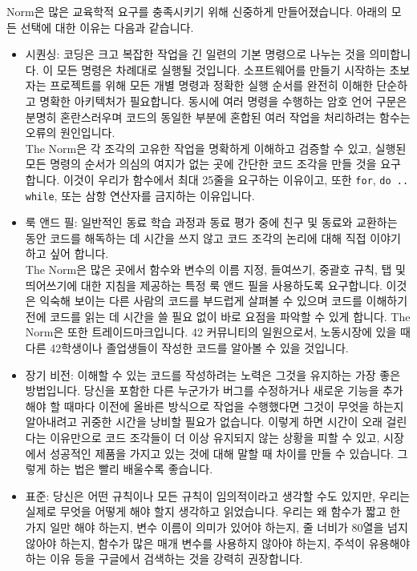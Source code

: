 \documentclass{42-ko}
\begin{document}
    Norm은 많은 교육학적 요구를 충족시키기 위해 신중하게 만들어졌습니다. 아래의
    모든 선택에 대한 이유는 다음과 같습니다.
    \begin{itemize}

    \item 시퀀싱: 코딩은 크고 복잡한 작업을 긴 일련의 기본 명령으로 나누는 것을 의미합니다.
      이 모든 명령은 차례대로 실행될 것입니다. 소프트웨어를 만들기 시작하는 초보자는 프로젝트를 위해
      모든 개별 명령과 정확한 실행 순서를 완전히 이해한 단순하고 명확한 아키텍처가 필요합니다.
      동시에 여러 명령을 수행하는 암호 언어 구문은 분명히 혼란스러우며 코드의 동일한 부분에 혼합된
      여러 작업을 처리하려는 함수는 오류의 원인입니다.\\
      The Norm은 각 조각의 고유한 작업을 명확하게 이해하고 검증할 수 있고, 실행된 모든 명령의 순서가
      의심의 여지가 없는 곳에 간단한 코드 조각을 만들 것을 요구합니다. 이것이 우리가 함수에서
      최대 25줄을 요구하는 이유이고, 또한 \texttt{for}, \texttt{do .. while}, 또는 삼항 연산자를
      금지하는 이유입니다.

    \item 룩 앤드 필: 일반적인 동료 학습 과정과 동료 평가 중에 친구 및 동료와 교환하는 동안
      코드를 해독하는 데 시간을 쓰지 않고 코드 조각의 논리에 대해 직접 이야기하고 싶어 합니다.\\
      The Norm은 많은 곳에서 함수와 변수의 이름 지정, 들여쓰기, 중괄호 규칙, 탭 및 띄어쓰기에
      대한 지침을 제공하는 특정 룩 앤드 필을 사용하도록 요구합니다. 이것은 익숙해 보이는
      다른 사람의 코드를 부드럽게 살펴볼 수 있으며 코드를 이해하기 전에 코드를 읽는 데 시간을 쓸 필요
      없이 바로 요점을 파악할 수 있게 합니다. The Norm은 또한 트레이드마크입니다. 42 커뮤니티의
      일원으로서, 노동시장에 있을 때 다른 42학생이나 졸업생들이 작성한 코드를 알아볼 수 있을 것입니다.

    \item 장기 비전: 이해할 수 있는 코드를 작성하려는 노력은 그것을 유지하는 가장 좋은 방법입니다.
      당신을 포함한 다른 누군가가 버그를 수정하거나 새로운 기능을 추가해야 할 때마다 이전에 올바른
      방식으로 작업을 수행했다면 그것이 무엇을 하는지 알아내려고 귀중한 시간을 낭비할 필요가 없습니다.
      이렇게 하면 시간이 오래 걸린다는 이유만으로 코드 조각들이 더 이상 유지되지 않는 상황을 피할 수 있고,
      시장에서 성공적인 제품을 가지고 있는 것에 대해 말할 때 차이를 만들 수 있습니다. 그렇게 하는 법은
      빨리 배울수록 좋습니다.

    \item 표준: 당신은 어떤 규칙이나 모든 규칙이 임의적이라고 생각할 수도 있지만, 우리는 실제로 무엇을 어떻게
      해야 할지 생각하고 읽었습니다. 우리는 왜 함수가 짧고 한 가지 일만 해야 하는지, 변수 이름이 의미가 있어야
      하는지, 줄 너비가 80열을 넘지 않아야 하는지, 함수가 많은 매개 변수를 사용하지 않아야 하는지, 주석이
      유용해야 하는 이유 등을 구글에서 검색하는 것을 강력히 권장합니다.

    \end{itemize}
\end{document}
